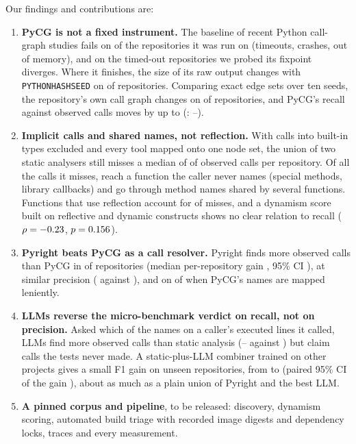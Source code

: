 \documentclass[conference]{IEEEtran}
\providecommand{\nRuntimeRepos}{\pending}
\newcommand{\sweepContribution}{. Comparing exact edge sets over ten seeds, the repository's own
  call graph changes on \nSetNondet{} of \nSetSwept{} repositories, and PyCG's recall against observed
  calls moves by up to \sweepMaxDelta{} (\texttt{\sweepWorstRepo}: \sweepWorstLo--\sweepWorstHi).}
\newcommand{\sweepContribution}{.}
\begin{document}
\noindent Our findings and contributions are:
\begin{enumerate}
\item \textbf{PyCG is not a fixed instrument.} The baseline of recent Python call-graph studies
fails on \pctPycgFailRun{} of the repositories it was run on (timeouts, crashes, out of memory),
and on the timed-out
repositories we probed its fixpoint diverges. Where it finishes, the size of its raw output changes
with \texttt{PYTHONHASHSEED} on \pctNondet{} of repositories\sweepContribution{}
\item \textbf{Implicit calls and shared names, not reflection.} With calls into built-in types excluded
and every tool mapped onto one node set, the union of two static analysers still misses a median
of \edgeUnionMissMed{} of observed calls per repository. Of all the calls it misses,
\missUnnamedAll{} reach a function the caller never names (special methods, library callbacks) and
\missSharedAll{} go through method names shared by several functions. Functions that use reflection
account for \pctMissReflective{} of misses, and a dynamism score built on reflective and dynamic
constructs shows no clear relation to recall ($\rho = -0.23$, $p = 0.156$).
\item \textbf{Pyright beats PyCG as a call resolver.} Pyright finds more observed calls than
PyCG in \nPyrightBeatsPycg{} of \nRuntimeRepos{} repositories (median per-repository gain \pyrMinusPycgMed, 95\% CI
\ciPyrMinusPycgMed), at similar precision (\itemPyrightP{} against \itemPycgP{}), and on \mapPyrWinsLenient{} of
\nMapRepos{} when PyCG's names are mapped leniently.
\item \textbf{LLMs reverse the micro-benchmark verdict on recall, not on precision.} Asked which of
the names on a caller's executed lines it called, LLMs find more observed calls than static
analysis (\llmQwenR--\llmOneTwentyR{} against \llmTwentyStaticR{}) but claim calls the tests never
made. A static-plus-LLM combiner trained on other projects gives a small F1 gain on unseen
repositories, from \loroUnionFone{} to \loroCombFone{} (paired 95\% CI of the gain \ciLoroDiffUnion), about as much as a plain union of Pyright and
the best LLM.
\item \textbf{A pinned corpus and pipeline}, to be released: discovery, dynamism scoring, automated
build triage with recorded image digests and dependency locks, traces and every measurement.
\end{enumerate}

\end{document}
